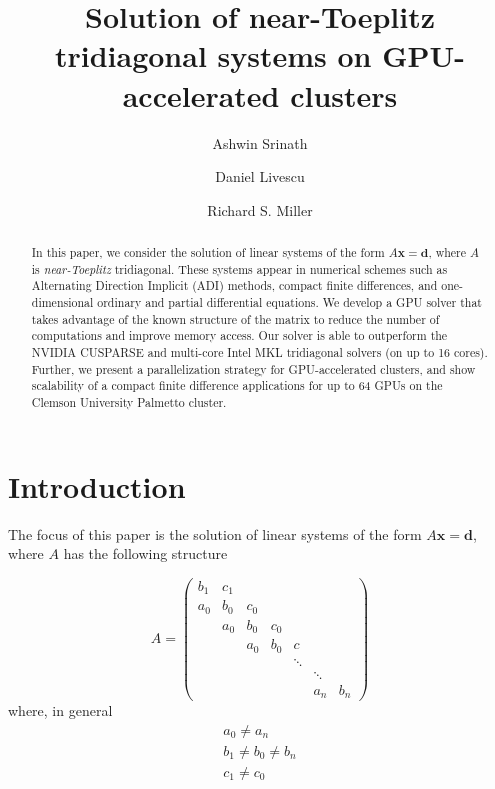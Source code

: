 \documentclass{elsarticle}
\begin{document}
\begin{frontmatter}
\author{Ashwin Srinath }
\author{Daniel Livescu }
\author{Richard S. Miller }
 

\title{Solution of near-Toeplitz tridiagonal systems on
GPU-accelerated clusters}
  
\begin{abstract}
In this paper, we consider the solution of linear
systems of the form $A\bm{x} = \bm{d}$,
where $A$ is \emph{near-Toeplitz} tridiagonal.
These systems appear in numerical schemes
such as
Alternating Direction Implicit (ADI) methods,
compact finite differences,
and one-dimensional ordinary
and partial differential equations.
We develop a GPU solver that takes advantage
of the known structure of the matrix
to reduce the number of computations
and improve memory access.
Our solver is able to outperform
the NVIDIA CUSPARSE and
multi-core Intel MKL tridiagonal solvers
(on up to 16 cores).
Further, we present a parallelization strategy
for GPU-accelerated clusters,
and show scalability of a compact finite difference applications
for up to 64 GPUs on the Clemson University Palmetto cluster.

\end{abstract}

\end{frontmatter}
\section{Introduction}

The focus of this paper is the solution of
linear systems of the form $A\bm{x} = \bm{d}$,
where $A$ has the following structure

\begin{equation} \label{eqn:toeplitz-matrix}
A = 
\begin{pmatrix}
     b_1 & c_1  \\
     a_0 & b_0  &  c_0  \\
         & a_0  &  b_0 &  c_0  \\
         &      &  a_0 &  b_0 &  c    \\
         &      &      &      &  \ddots \\
         &      &      &      &     &  \ddots  \\
         &      &      &      &     &  a_n  &  b_n
\end{pmatrix}
\end{equation}
%
where, in general
\begin{align*}
    & a_0 \neq a_n & \\
    & b_1 \neq b_0 \neq b_n &\\
    & c_1 \neq c_0 &
\end{align*}
\end{document}
